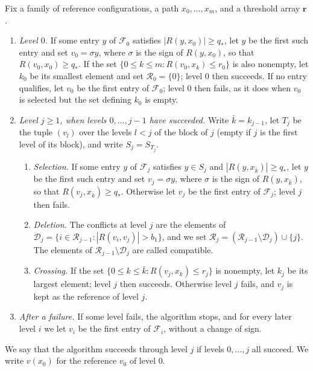 \begin{definition}\label{def:ind-algorithm}
Fix a family of reference configurations, a path $x_0,\dots,x_m$, and a threshold array $\mathbf r$.
\begin{enumerate}[label=(\roman*)]
\item \emph{Level $0$.} If some entry $y$ of $\mathcal F_0$ satisfies $|R(y,x_0)|\ge q_*$, let $y$ be the first such entry and set $v_0=\sigma y$, where $\sigma$ is the sign of $R(y,x_0)$, so that $R(v_0,x_0)\ge q_*$. If the set $\{0\le k\le m:R(v_0,x_k)\le r_0\}$ is also nonempty, let $k_0$ be its smallest element and set $\mathcal R_0=\{0\}$; level $0$ then succeeds. If no entry qualifies, let $v_0$ be the first entry of $\mathcal F_0$; level $0$ then fails, as it does when $v_0$ is selected but the set defining $k_0$ is empty.
\item \emph{Level $j\ge1$, when levels $0,\dots,j-1$ have succeeded.} Write ${\bar k}=k_{j-1}$, let $T_j$ be the tuple $(v_l)$ over the levels $l<j$ of the block of $j$ (empty if $j$ is the first level of its block), and write $S_j=S_{T_j}$.
\begin{enumerate}[label=(\alph*)]
\item \emph{Selection.} If some entry $y$ of $\mathcal F_j$ satisfies $y\in S_j$ and $|R(y,x_{\bar k})|\ge q_*$, let $y$ be the first such entry and set $v_j=\sigma y$, where $\sigma$ is the sign of $R(y,x_{\bar k})$, so that $R(v_j,x_{\bar k})\ge q_*$. Otherwise let $v_j$ be the first entry of $\mathcal F_j$; level $j$ then fails.
\item \emph{Deletion.} The conflicts at level $j$ are the elements of $\mathcal D_j=\{i\in\mathcal R_{j-1}:|R(v_i,v_j)|>b_1\}$, and we set $\mathcal R_j=(\mathcal R_{j-1}\setminus \mathcal D_j)\cup\{j\}$. The elements of $\mathcal R_{j-1}\setminus \mathcal D_j$ are called compatible.
\item \emph{Crossing.} If the set $\{0\le k\le {\bar k}:R(v_j,x_k)\le r_j\}$ is nonempty, let $k_j$ be its largest element; level $j$ then succeeds. Otherwise level $j$ fails, and $v_j$ is kept as the reference of level $j$.
\end{enumerate}
\item \emph{After a failure.} If some level fails, the algorithm stops, and for every later level $i$ we let $v_i$ be the first entry of $\mathcal F_i$, without a change of sign.
\end{enumerate}
We say that the algorithm succeeds through level $j$ if levels $0,\dots,j$ all succeed. We write $v(x_0)$ for the reference $v_0$ of level $0$.
\end{definition}

